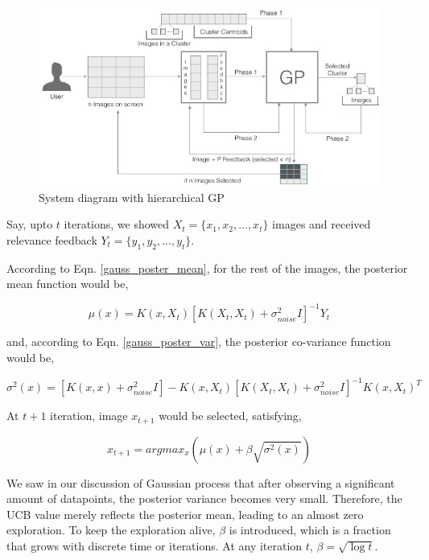\documentclass[english]{tktltiki}
\begin{document}
\begin{figure}[h!]
  \centering
    \includegraphics[width=1.0\textwidth]{figures/Imse_System_Diagram}
    \caption{System diagram with hierarchical GP}
    \label{system_diagram_1}
\end{figure}

Say, upto $t$ iterations, we showed $X_t = \{x_1, x_2, ..., x_t\}$ images and received relevance feedback $Y_t = \{y_1, y_2, ..., y_t\}$.

According to Eqn. \ref{gauss_poster_mean}, for the rest of the images, the posterior mean function would be,

\begin{equation}
\mu(x) = K(x, X_t)[K(X_t, X_t) + \sigma_{noise}^2I]^{-1}Y_t
\end{equation}

and, according to Eqn. \ref{gauss_poster_var}, the posterior co-variance function would be,

\begin{equation}
\sigma^2(x) = [K(x, x) + \sigma_{noise}^2I] - K(x, X_t)[K(X_t, X_t) + \sigma_{noise}^2I]^{-1}K(x, X_t)^T
\end{equation}

At $t+1$ iteration, image $x_{t+1}$ would be selected, satisfying,

\begin{equation}
x_{t+1} = argmax_x(\mu(x) + \beta\sqrt{\sigma^2(x)})
\end{equation}

We saw in our discussion of Gaussian process that after observing a significant amount of datapoints, the posterior variance becomes very small. Therefore, the UCB value merely reflects the posterior mean, leading to an almost zero exploration. To keep the exploration alive, $\beta$ is introduced, which is a fraction that grows with discrete time or iterations. At any iteration $t$, $\beta = \sqrt{\log t}$.
\end{document}
